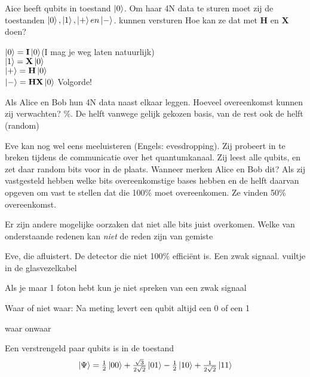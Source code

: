 \documentclass[a4paper, addpoints, 12pt
    , noanswers    %
    ]{exam}
\newcommand*{\port}[1]{\textbf{#1}}
\begin{document}
\begin{questions}
\question[1]
Aice heeft qubits in toestand $\ket{0}$. Om haar 4N data te sturen moet zij de toestanden $\ket{0}, \ket{1}, \ket{+} en \ket{-}$. kunnen versturen
Hoe kan ze dat met \port{H} en \port{X} doen?

\ifprintanswers
\else
$\ket{0}=\port{I}\ket{0}$(I mag je weg laten natuurlijk)\\
$\ket{1}=\port{X}\ket{0}$\\
$\ket{+}=\port{H}\ket{0}$\\
$\ket{-}=\port{H}\port{X}\ket{0}$ Volgorde!\\
\fillwithlines{1in}
\fi

\question[1]
Als Alice en Bob hun 4N data naast elkaar leggen. Hoeveel overeenkomst kunnen zij verwachten?
\%. De helft vanwege gelijk gekozen basis, van de rest ook de helft (random)
\else
\fillwithlines{1in}
\fi

Eve kan nog wel eens meeluisteren (Engels: evesdropping).  Zij probeert in te breken tijdens de communicatie over het quantumkanaal. 
Zij leest alle qubits, en zet daar random bits voor in de plaats.
Wanneer merken Alice en Bob dit?
\ifprintanswers
Als zij vastgesteld hebben welke bits overeenkomstige bases hebben en de  helft daarvan opgeven om vast te stellen dat die 100\% moet overeenkomen. Ze vinden 50\% overeenkomst.
\else
\fillwithlines{1in}
\fi

Er zijn andere mogelijke oorzaken dat niet alle bits juist overkomen. Welke van onderstaande redenen kan \textit{niet} de  reden zijn van gemiste

\begin{choices}
\choice Eve, die afluistert.
\choice De detector die niet 100\% effici\"ent is.
\correctchoice Een zwak signaal.
\choice vuiltje in de glasvezelkabel
\end{choices} 
\question[1]
\ifprintanswers
Als je maar 1 foton hebt kun je niet spreken van een zwak signaal
\else
\fillwithlines{1in}
\fi

\question [1]
Waar of niet waar: Na meting levert een qubit altijd een 0 of een 1
\begin{oneparchoices}
\correctchoice waar
\choice onwaar
\end{oneparchoices}

\question [1]
Een verstrengeld paar qubits is in de toestand
\[\ket{\Psi}=\tfrac{1}{2}\ket{00}+\tfrac{\sqrt{3}}{2\sqrt{2}}\ket{01}-\tfrac{1}{2}\ket{10}+\tfrac{1}{2\sqrt{2}}\ket{11}\]
\end{questions}
\end{document}
